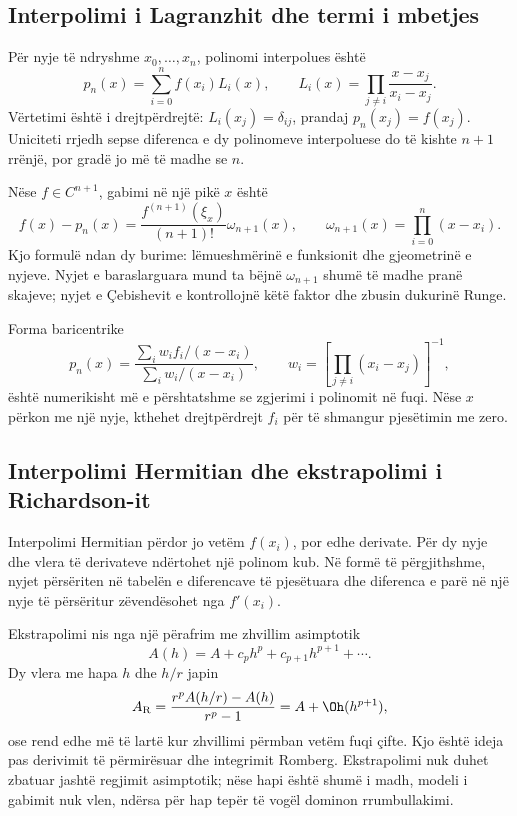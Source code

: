 \subsection{Interpolimi i Lagranzhit dhe termi i mbetjes}
Për nyje të ndryshme $x_0,\ldots,x_n$, polinomi interpolues është
\begin{equation}
 p_n(x)=\sum_{i=0}^{n}f(x_i)L_i(x),\qquad
 L_i(x)=\prod_{j\ne i}\frac{x-x_j}{x_i-x_j}.
\end{equation}
Vërtetimi është i drejtpërdrejtë: $L_i(x_j)=\delta_{ij}$, prandaj $p_n(x_j)=f(x_j)$. Uniciteti rrjedh sepse diferenca e dy polinomeve interpoluese do të kishte $n+1$ rrënjë, por gradë jo më të madhe se $n$.

Nëse $f\in C^{n+1}$, gabimi në një pikë $x$ është
\begin{equation}
 f(x)-p_n(x)=\frac{f^{(n+1)}(\xi_x)}{(n+1)!}
 \omega_{n+1}(x),\qquad
 \omega_{n+1}(x)=\prod_{i=0}^{n}(x-x_i).
\end{equation}
Kjo formulë ndan dy burime: lëmueshmërinë e funksionit dhe gjeometrinë e nyjeve. Nyjet e baraslarguara mund ta bëjnë $\omega_{n+1}$ shumë të madhe pranë skajeve; nyjet e Çebishevit e kontrollojnë këtë faktor dhe zbusin dukurinë Runge.

Forma baricentrike
\begin{equation}
 p_n(x)=\frac{\sum_i w_i f_i/(x-x_i)}{\sum_i w_i/(x-x_i)},
 \qquad w_i=\left[\prod_{j\ne i}(x_i-x_j)\right]^{-1},
\end{equation}
është numerikisht më e përshtatshme se zgjerimi i polinomit në fuqi. Nëse $x$ përkon me një nyje, kthehet drejtpërdrejt $f_i$ për të shmangur pjesëtimin me zero.

\subsection{Interpolimi Hermitian dhe ekstrapolimi i Richardson-it}
Interpolimi Hermitian përdor jo vetëm $f(x_i)$, por edhe derivate. Për dy nyje dhe vlera të derivateve ndërtohet një polinom kub. Në formë të përgjithshme, nyjet përsëriten në tabelën e diferencave të pjesëtuara dhe diferenca e parë në një nyje të përsëritur zëvendësohet nga $f'(x_i)$.

Ekstrapolimi nis nga një përafrim me zhvillim asimptotik
\begin{equation}
 A(h)=A+c_ph^p+c_{p+1}h^{p+1}+\cdots.
\end{equation}
Dy vlera me hapa $h$ dhe $h/r$ japin
\begin{equation}
 A_{\mathrm{R}}=\frac{r^pA(h/r)-A(h)}{r^p-1}
 =A+\Oh(h^{p+1}),
\end{equation}
ose rend edhe më të lartë kur zhvillimi përmban vetëm fuqi çifte. Kjo është ideja pas derivimit të përmirësuar dhe integrimit Romberg. Ekstrapolimi nuk duhet zbatuar jashtë regjimit asimptotik; nëse hapi është shumë i madh, modeli i gabimit nuk vlen, ndërsa për hap tepër të vogël dominon rrumbullakimi.

